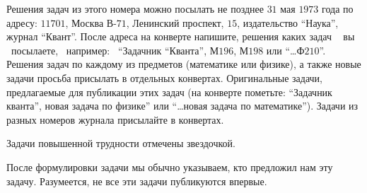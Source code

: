
% 



\twocolumn
\par
 Решения задач из этого номера можно посылать не позднее $31$ мая $1973$ года по адресу: $11701$, Москва В-$71$, Ленинский проспект, $15$, издательство “Наука”, журнал “Квант”. После адреса на конверте напишите, решения каких задач ~ вы ~посылаете,~ например: ~“Задачник “Кванта”, М$196$, М$198$ или “…Ф$210$”. Решения задач по каждому из предметов (математике или физике), а также новые задачи просьба присылать в отдельных конвертах. Оригинальные задачи, предлагаемые для публикации этих задач (на конверте пометьте: “Задачник кванта”, новая задача по физике” или “…новая задача по математике”). Задачи из разных номеров журнала присылайте в конвертах.
 \par
Задачи повышенной трудности отмечены звездочкой. \par
После формулировки задачи мы обычно указываем, кто предложил нам эту задачу. Разумеется, не все эти задачи публикуются впервые.

